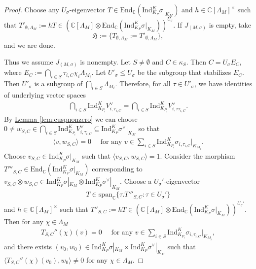 \documentclass[10pt,a4paper]{amsart}
\newcommand{\CC}{\mathbb{C}}
\newcommand{\Ind}{\mathrm{Ind}}
\begin{document}
\begin{proof}      
  Choose any $U_\sigma$-eigenvector $T\in \mathrm{End}_\CC (\Ind_{K_P}^K \sigma|_{K_M})$ and $h\in \CC[\Lambda_M]^\times$ such that $T'_{\emptyset,\Lambda_M}:=hT\in (\CC[\Lambda_M]\otimes \mathrm{End}_\CC (\Ind_{K_P}^K \sigma|_{K_M}))^{U_\sigma}.$ If $J_{(M,\sigma)}$ is empty, take $$\mathfrak{H}:=\{T_{\emptyset,\Lambda_M}:=T'_{\emptyset,\Lambda_M}\},$$ and we are done.
 
 Thus we assume $J_{(M,\sigma)}$ is nonempty. Let $S\neq \emptyset$ and $C\in \kappa_S$. Then $C=U_\sigma E_C,$ where $E_C:=\bigcap_{i\in S} \tau_{i,C}\chi_i\Lambda_{M_i}.$  
Let $U'_\sigma\le U_\sigma$ be the subgroup that stabilizes $E_C$. Then $U'_\sigma$ is a subgroup of $\bigcap_{i\in S}\Lambda_{M_i}.$  Therefore, for all $\tau\in U'_{\sigma}$, we have identities of underlying vector spaces
\begin{align*}
    \bigcap_{i\in S}\mathrm{Ind}_{K_{P_i}}^{K}V_{i,\tau_{i,C}}^\lor=\bigcap_{i\in S}\mathrm{Ind}_{K_{P_i}}^{K}V_{i,\tau\tau_{i,C}}^\lor.
\end{align*}
By \hyperref[lem:cuspnonzero]{Lemma \ref{lem:cuspnonzero}} we can choose $0\neq w_{S,C}\in \bigcap_{i\in S}\mathrm{Ind}_{K_{P_i}}^{K}V_{i,\tau_{i,C}}^\lor \subseteq\mathrm{Ind}_{K_{P}}^{K} \sigma^\lor|_{K_M}$ so that
\begin{align*}
\langle v,w_{S,C}\rangle=0 \quad\textrm{ for any } v\in \sum_{i\in S}\mathrm{Ind}_{K_{P_i}}^{K} \sigma_{i,\tau_{i,C}}|_{K_{M_i}}.
\end{align*}
Choose $v_{S,C}\in \Ind_{K_P}^K\sigma|_{K_M}$ such that $\langle v_{S,C},w_{S,C}\rangle=1$. Consider the morphism $T'''_{S,C}\in \mathrm{End}_\CC (\Ind_{K_P}^K \sigma|_{K_M})$ corresponding to $v_{S,C}\otimes w_{S,C}\in \mathrm{Ind}_{K_P}^K\sigma|_{K_M}\otimes \mathrm{Ind}_{K_P}^K\sigma^\lor|_{K_M}.$ Choose a $U_\sigma'$-eigenvector 
\begin{align*}
    T\in \mathrm{span}_\CC\{ \tau.T'''_{S,C}: \tau\in U_{\sigma}'\}
\end{align*}
and $h\in \CC[\Lambda_M]^\times$ such that $T''_{S,C}:=hT\in (\CC[\Lambda_M]\otimes \mathrm{End}_\CC (\Ind_{K_P}^K \sigma|_{K_M}))^{U_\sigma'}.$ Then for any $\chi\in \Lambda_M$
\begin{align*}
    T_{S,C}''(\chi)(v)=0\quad\textrm{ for any } v\in \sum_{i\in S}\mathrm{Ind}_{K_{P_i}}^{K} \sigma_{i,\tau_{i,C}}|_{K_{M_i}},
\end{align*}
and there exists $(v_0,w_0)\in \Ind_{K_{P}}^K \sigma|_{K_{M}}\times \Ind_{K_{P}}^K \sigma^\lor|_{K_{M}}$ such that $\langle T_{S,C}''(\chi)(v_0),w_0\rangle\neq 0$ for any $\chi\in \Lambda_M.$


\end{proof}
\end{document}

